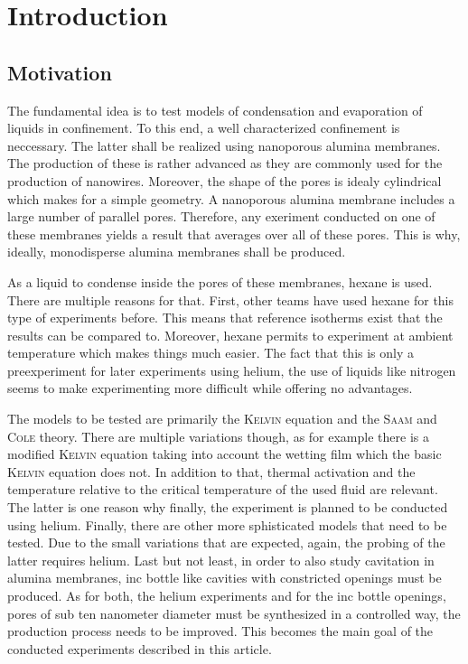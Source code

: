 \documentclass[../thesis.tex]{subfiles}
\begin{document}
  \chapter{Introduction}
  \label{ch:introduction}

    \section{Motivation}
    \label{sec:motivation}

      The fundamental idea is to test models of condensation and evaporation of liquids in confinement. To this end, a well characterized confinement is neccessary. The latter shall be realized using nanoporous alumina membranes. The production of these is rather advanced as they are commonly used for the production of nanowires. Moreover, the shape of the pores is idealy cylindrical which makes for a simple geometry. A nanoporous alumina membrane includes a large number of parallel pores. Therefore, any exeriment conducted on one of these membranes yields a result that averages over all of these pores. This is why, ideally, monodisperse alumina membranes shall be produced.

      As a liquid to condense inside the pores of these membranes, hexane is used. There are multiple reasons for that. First, other teams have used hexane for this type of experiments before. This means that reference isotherms exist that the results can be compared to. Moreover, hexane permits to experiment at ambient temperature which makes things much easier. The fact that this is only a preexperiment for later experiments using helium, the use of liquids like nitrogen seems to make experimenting more difficult while offering no advantages.

      The models to be tested are primarily the \textsc{Kelvin} equation and the \textsc{Saam} and \textsc{Cole} theory. There are multiple variations though, as for example there is a modified \textsc{Kelvin} equation taking into account the wetting film which the basic \textsc{Kelvin} equation does not. In addition to that, thermal activation and the temperature relative to the critical temperature of the used fluid are relevant. The latter is one reason why finally, the experiment is planned to be conducted using helium. Finally, there are other more sphisticated models that need to be tested. Due to the small variations that are expected, again, the probing of the latter requires helium. Last but not least, in order to also study cavitation in alumina membranes, inc bottle like cavities with constricted openings must be produced. As for both, the helium experiments and for the inc bottle openings, pores of sub ten nanometer diameter must be synthesized in a controlled way, the production process needs to be improved. This becomes the main goal of the conducted experiments described in this article.
\end{document}
